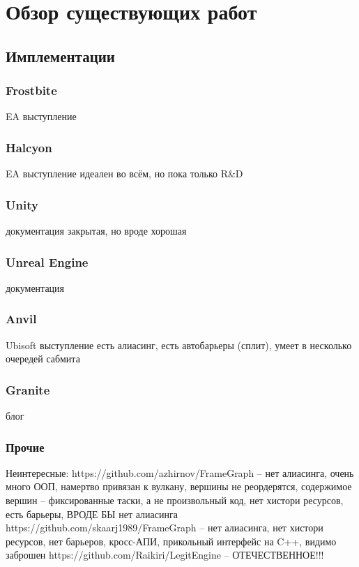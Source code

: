 \section{Обзор существующих работ}
\subsection{Имплементации}

\subsubsection*{Frostbite}
EA выступление\cite{FrostbiteGdcTalk}

\subsubsection*{Halcyon}
EA выступление\cite{HalcyonRapidInnovationTalk}
идеален во всём, но пока только R\&D

\subsubsection*{Unity}
документация\cite{UnityRenderGraph}
закрытая, но вроде хорошая

\subsubsection*{Unreal Engine}
документация\cite{UERenderDependencyGraph}

\subsubsection*{Anvil}
Ubisoft выступление\cite{DX12CaseStudies}
есть алиасинг, есть автобарьеры (сплит), умеет в несколько очередей сабмита

\subsubsection*{Granite}
блог\cite{GraniteBlogPost}

\subsubsection*{Прочие}
Неинтересные:
https://github.com/azhirnov/FrameGraph -- нет алиасинга, очень много ООП, намертво привязан к вулкану, вершины не реордерятся, содержимое вершин -- фиксированные таски, а не произвольный код, нет хистори ресурсов, есть барьеры, ВРОДЕ БЫ нет алиасинга
https://github.com/skaarj1989/FrameGraph -- нет алиасинга, нет хистори ресурсов, нет барьеров, кросс-АПИ, прикольный интерфейс на C++, видимо заброшен
https://github.com/Raikiri/LegitEngine -- ОТЕЧЕСТВЕННОЕ!!!
